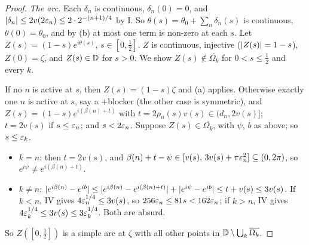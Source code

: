 \begin{proof}
\emph{The arc.} Each $\delta_n$ is continuous, $\delta_n(0)=0$, and $\lvert \delta_n\rvert\le2v(2\varepsilon_n)\le2\cdot2^{-(n+1)/4}$ by I. So
$\theta(s)=\theta_0+\sum_n\delta_n(s)$ is continuous, $\theta(0)=\theta_0$, and by (b) at most one term is non-zero at each $s$. Let
$Z(s)=(1-s)e^{i\theta(s)}$, $s\in[0,\frac12]$. $Z$ is continuous, injective ($\lvert Z(s)\rvert=1-s$), $Z(0)=\zeta$, and $Z(s)\in\mathbb{D}$
for $s>0$. We show $Z(s)\notin\overline{\Omega_k}$ for $0<s\le\frac12$ and every $k$.

If no $n$ is active at $s$, then $Z(s)=(1-s)\zeta$ and (a) applies. Otherwise exactly one $n$ is active at $s$, say a $+$blocker
(the other case is symmetric), and $Z(s)=(1-s)e^{i(\beta(n)+t)}$ with $t=2\rho_n(s)v(s)\in(d_n,2v(s)]$; $t=2v(s)$ if $s\le\varepsilon_n$; and
$s<2\varepsilon_n$. Suppose $Z(s)\in\overline{\Omega_k}$, with $\psi$, $b$ as above; so $s\le\varepsilon_k$.
\begin{itemize}
\item $k=n$: then $t=2v(s)$, and $\beta(n)+t-\psi\in[v(s),\,3v(s)+\pi\varepsilon_n^2]\subseteq(0,2\pi)$, so $e^{i\psi}\ne e^{i(\beta(n)+t)}$.
\item $k\ne n$: $\lvert e^{i\beta(n)}-e^{ib}\rvert\le\lvert e^{i\beta(n)}-e^{i(\beta(n)+t)}\rvert+\lvert e^{i\psi}-e^{ib}\rvert\le t+v(s)\le3v(s)$. If $k<n$, IV gives
$4\varepsilon_n^{1/4}\le3v(s)$, so $256\varepsilon_n\le81s<162\varepsilon_n$; if $k>n$, IV gives $4\varepsilon_k^{1/4}\le3v(s)\le3\varepsilon_k^{1/4}$. Both are absurd.
\end{itemize}
So $Z([0,\frac12])$ is a simple arc at $\zeta$ with all other points in $\mathbb{D}\setminus\bigcup_k\overline{\Omega_k}$.
\end{proof}

